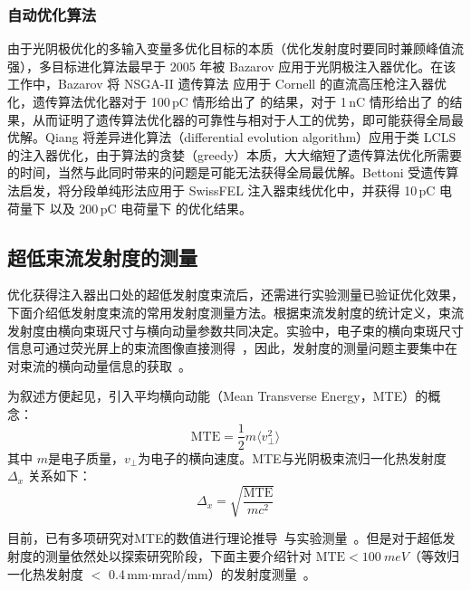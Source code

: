\subsubsection{自动优化算法}
由于光阴极优化的多输入变量多优化目标的本质（优化发射度时要同时兼顾峰值流强），多目标进化算法最早于 2005 年被 Bazarov 应用于光阴极注入器优化\cite{Bazarov:2005aa}。在该工作中，Bazarov 将 NSGA-II 遗传算法\cite{Deb:2002aa} 应用于 Cornell 的直流高压枪注入器优化，遗传算法优化器对于 100\,pC 情形给出了  的结果，对于 1\,nC 情形给出了  的结果，从而证明了遗传算法优化器的可靠性与相对于人工的优势，即可能获得全局最优解。Qiang 将差异进化算法（differential evolution algorithm）应用于类 LCLS 的注入器优化，由于算法的贪婪（greedy）\cite{cormen2009introduction}本质，大大缩短了遗传算法优化所需要的时间\cite{Qiang:2013aa}，当然与此同时带来的问题是可能无法获得全局最优解。Bettoni 受遗传算法启发，将分段单纯形法应用于 SwissFEL 注入器束线优化中，并获得 10\,pC 电荷量下  以及 200\,pC 电荷量下  的优化结果\cite{Bettoni:2015aa}。

\subsection{超低束流发射度的测量}
优化获得注入器出口处的超低发射度束流后，还需进行实验测量已验证优化效果，下面介绍低发射度束流的常用发射度测量方法。根据束流发射度的统计定义，束流发射度由横向束斑尺寸与横向动量参数共同决定。实验中，电子束的横向束斑尺寸信息可通过荧光屏上的束流图像直接测得~\cite{Graves:1997aa,Walasek-Hohne:2011aa}，因此，发射度的测量问题主要集中在对束流的横向动量信息的获取~\cite{lee2015review}。

为叙述方便起见，引入平均横向动能（Mean Transverse Energy，MTE）的概念\cite{bazarov2008thermal,bazarov2009maximum,lee2015review}：
\begin{equation}
\text{MTE} = \frac{1}{2}m\langle v_\perp^2\rangle
\end{equation}
其中 $m$是电子质量，$v_\perp$为电子的横向速度。MTE与光阴极束流归一化热发射度 $\Delta_{x}$ 关系如下：
\begin{equation}
\label{eq:es_MTE}
\Delta_{x} = \sqrt{\frac{\text{MTE}}{mc^2}}
\end{equation}

目前，已有多项研究对MTE的数值进行理论推导~\cite{karkare2011effect,karkare2013monte}与实验测量~\cite{bazarov2009maximum,engelen2014effective,dowell2009quantum,qian2012experimental}。但是对于超低发射度的测量依然处以探索研究阶段，下面主要介绍针对 $\text{MTE}<\SI{100}{meV}$（等效归一化热发射度 $<$ 0.4\,mm$\cdot$mrad/mm）的发射度测量~\cite{hauri2010intrinsic,lee2015review}。


